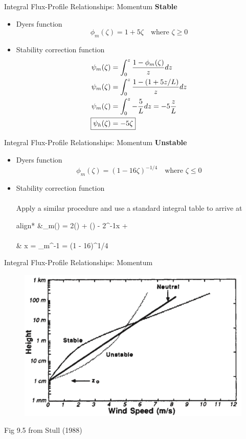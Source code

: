 \begin{frame}{Integral Flux-Profile Relationships: Momentum}
\textbf{Stable}
\begin{itemize}
	\item Dyers function
	$$\phi_m(\zeta) = 1 + 5\zeta \quad \text{where } \zeta \geq 0$$
	\item Stability correction function
	\begin{align*}
		\psi_m(\zeta) &= \int^z_0 \frac{1-\phi_m(\zeta)}{z} dz\\
		\psi_m(\zeta) &= \int^z_0 \frac{1-(1+5z/L)}{z} dz\\
		\psi_m(\zeta) &= \int^z_0 -\frac{5}{L} dz = -5\frac{z}{L}\\
		\Aboxed{\psi_h(\zeta) &= -5\zeta}
	\end{align*}
\end{itemize}
\end{frame}
\begin{frame}{Integral Flux-Profile Relationships: Momentum}
\textbf{Unstable}
\begin{itemize}
	\item Dyers function
	$$\phi_m(\zeta) = (1 - 16\zeta)^{-1/4}  \quad \text{where } \zeta \leq 0$$
	\item Stability correction function
	~\\~\\Apply a similar procedure and use a standard integral table to arrive at
	\begin{empheq}[box=\widefbox]{align*}
		&\psi_m(\zeta) = 2\ln\left(\right) + \ln\left(\right) - 2\tan^{-1}x + \\\\
		& x = \phi_m^{-1} = (1 - 16\zeta)^{1/4}
	\end{empheq}
\end{itemize}
\end{frame}
\begin{frame}{Integral Flux-Profile Relationships: Momentum}
\begin{figure}
	\includegraphics[width=\textwidth]{loglaw1}
\end{figure}
\centering \tiny Fig 9.5 from Stull (1988)
\end{frame}
